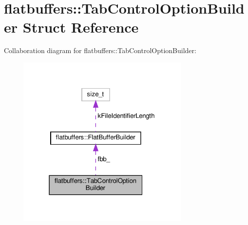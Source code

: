 \hypertarget{structflatbuffers_1_1TabControlOptionBuilder}{}\section{flatbuffers\+:\+:Tab\+Control\+Option\+Builder Struct Reference}
\label{structflatbuffers_1_1TabControlOptionBuilder}


Collaboration diagram for flatbuffers\+:\+:Tab\+Control\+Option\+Builder\+:
\nopagebreak
\begin{figure}[H]
\begin{center}
\leavevmode
\includegraphics[width=243pt]{structflatbuffers_1_1TabControlOptionBuilder__coll__graph}
\end{center}
\end{figure}
